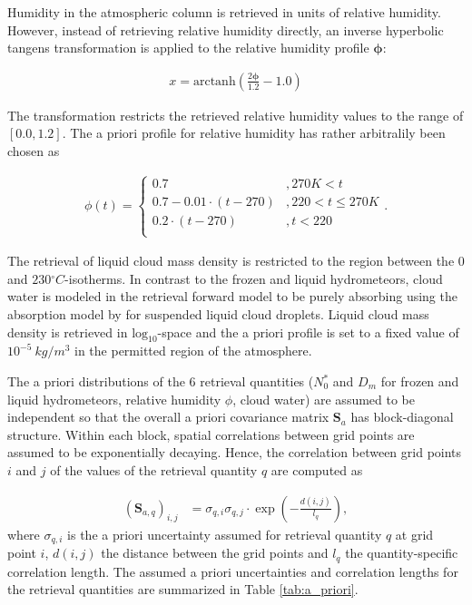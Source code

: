 \documentclass[journal abbreviation, manuscript]{copernicus}
\begin{document}
Humidity in the atmospheric column is retrieved in units of relative humidity.
However, instead of retrieving relative humidity directly, an inverse hyperbolic
tangens transformation is applied to the relative humidity profile $\mathbf{\phi}$:

\begin{align}
x = \text{arctanh}(\frac{2 \mathbf{\phi}}{1.2} - 1.0)
\end{align}

The transformation restricts the retrieved relative humidity values to
the range of $[0.0, 1.2]$. The a priori profile for relative humidity
has rather arbitralily been chosen as

\begin{align}
\phi(t) = \begin{cases}
 0.7 &, 270\unit{K} < t \\
 0.7 - 0.01 \cdot (t - 270) & ,220 < t \leq  270\unit{K} \\
 0.2 \cdot (t - 270) & ,t < 220 \\
 \end{cases}.
\end{align}

The retrieval of liquid cloud mass density is restricted to the region
between the $0$ and $230\unit{^\circ C}$-isotherms. In contrast to the
frozen and liquid hydrometeors, cloud water is modeled in the retrieval
forward model to be purely absorbing using the absorption model by
\cite{liebe92} for suspended liquid cloud droplets. Liquid cloud mass density
is retrieved in $\text{log}_{10}$-space and the a priori profile is set to a fixed
value of $10^{-5}\ \unit{kg / m^3}$ in the permitted region of the atmosphere.

The a priori distributions of the 6 retrieval quantities ($N_0^*$ and $D_m$
for frozen and liquid hydrometeors, relative humidity $\phi$, cloud water)
are assumed to be independent so that the overall a priori covariance matrix
$\mathbf{S}_a$ has block-diagonal structure. Within each block, spatial
correlations between grid points are assumed to be exponentially decaying.
Hence, the correlation between grid points $i$ and $j$ of the values of the
retrieval quantity $q$ are computed as

\begin{align}
\left ( \mathbf{S}_{a,q} \right )_{i, j} &= \sigma_{q,i} \sigma_{q,j}
 \cdot \exp ( -\frac{d(i, j)}{l_q}),
\end{align}
where $\sigma_{q, i}$ is the a priori uncertainty assumed for retrieval
quantity $q$ at grid point $i$, $d(i, j)$ the distance between the grid
points and $l_q$ the quantity-specific correlation length. The assumed
a priori uncertainties and correlation lengths for the retrieval quantities
are summarized in Table \ref{tab:a_priori}.
\end{document}
